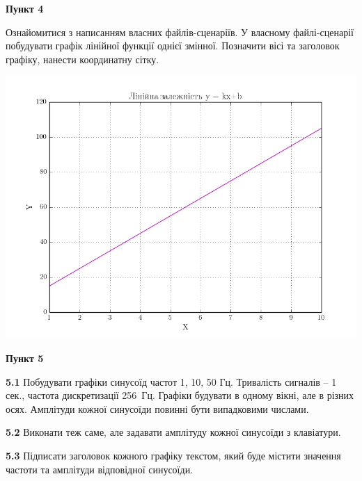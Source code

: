 \documentclass[a4paper,12pt]{article}
\begin{document}
\begin{center}
\textbf{Пункт 4}\par
\end{center}
Ознайомитися з написанням власних файлів-сценаріїв. У власному файлі-сценарії побудувати графік лінійної функції однієї змінної. Позначити вісі та заголовок графіку, нанести координатну сітку.\par

\begin{center}
\includegraphics[height = 12 cm,width=14 cm]{4.png}
\end{center}
\vspace{1cm}\par



\begin{center}
\textbf{Пункт 5}\par
\end{center}
\textbf{5.1} Побудувати графіки синусоїд частот 1, 10, 50 Гц. Тривалість сигналів – 1 сек., частота дискретизації 256 Гц. Графіки будувати в одному вікні, але в різних осях. Амплітуди кожної синусоїди повинні бути випадковими числами.\par
\textbf{5.2} Виконати теж саме, але  задавати амплітуду кожної синусоїди з клавіатури.\par
\textbf{5.3} Підписати заголовок кожного графіку текстом, який буде містити значення частоти та амплітуди відповідної синусоїди.\par

\end{document}
